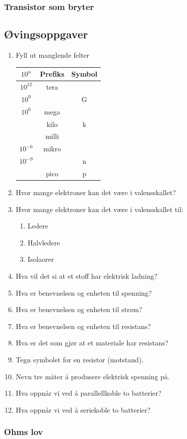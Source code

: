 \documentclass[12pt,a4paper]{article}
\providecommand{\tabularnewline}{\\}
\begin{document}
\subsubsection{Transistor som bryter}

\subsection{Øvingsoppgaver}
\begin{enumerate}
\item Fyll ut manglende felter\\
\begin{tabular}{|c|c|c|}
\hline 
$10^{n}$ & Prefiks  & Symbol\tabularnewline
\hline 
\hline 
$10^{12}$ & tera & \tabularnewline
\hline 
$10^{9}$ &  & G\tabularnewline
\hline 
$10^{6}$ & mega & \tabularnewline
\hline 
 & kilo  & k\tabularnewline
\hline 
 & milli  & \tabularnewline
\hline 
$10^{-6}$ & mikro  & \textmu{}\tabularnewline
\hline 
$10^{-9}$ &  & n\tabularnewline
\hline 
 & pico  & p\tabularnewline
\hline 
\end{tabular}
\item Hvor mange elektroner kan det være i valensskallet?
\item Hvor mange elektroner kan det være i valensskallet til:

\begin{enumerate}
\item Ledere
\item Halvledere 
\item Isolaorer 
\end{enumerate}
\item Hva vil det si at et stoff har elektrisk ladning?
\item Hva er benevnelsen og enheten til spenning?
\item Hva er benevnelsen og enheten til strøm?
\item Hva er benevnelsen og enheten til resistans?
\item Hva er det som gjør at et materiale har resistans?
\item Tegn symbolet for en resistor (motstand).
\item Nevn tre måter å produsere elektrisk spenning på. 
\item Hva oppnår vi ved å parallellkoble to batterier?
\item Hva oppnår vi ved å seriekoble to batterier?
\end{enumerate}

\subsubsection{Ohms lov}
\end{document}
